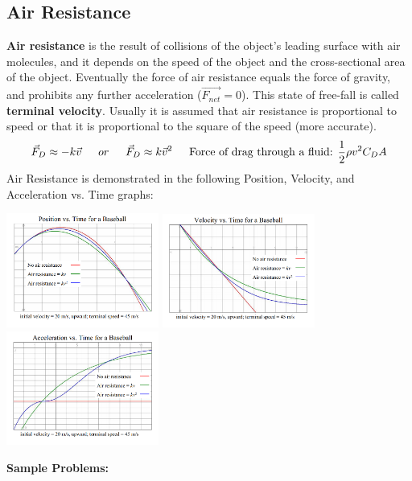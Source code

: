 \documentclass{article}
\begin{document}
  	\subsection{Air Resistance}
  		\textbf{Air resistance} is the result of collisions of the object's leading surface with air molecules, and it depends on the speed of the object and the cross-sectional area of the object. Eventually the force of air resistance equals the force of gravity, and prohibits any further acceleration ($\vec{F_{net}}=0$). This state of free-fall is called \textbf{terminal velocity}. Usually it is assumed that air resistance is proportional to speed or that it is proportional to the square of the speed (more accurate).
  		\[
        	\vec{F}_{D}\approx -k\vec{v} \indent or \indent \vec{F}_{D}\approx k\vec{v}^2
            \indent \text{Force of drag through a fluid: } \frac{1}{2}\rho v^2 C_D A
        \]
        Air Resistance is demonstrated in the following Position, Velocity, and Acceleration vs. Time graphs:\\
        \centerline{
  			\includegraphics[width=5cm]{pvt_air.png}
        	\includegraphics[width=5cm]{vvt_air.png}
        	\includegraphics[width=5cm]{avt_air.png}
        }
  		\textbf{Sample Problems:}
\end{document}
